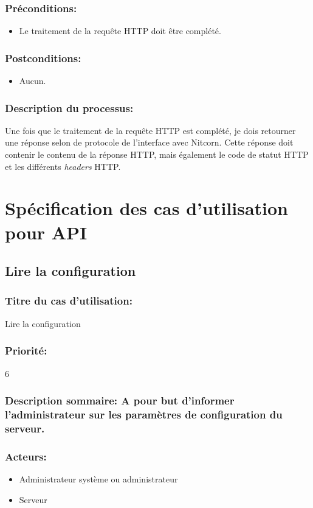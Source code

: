 \documentclass{scrreprt}
\begin{document}
\subsubsection{Préconditions:}
\begin{itemize}
	\item Le traitement de la requête HTTP doit être complété.
\end{itemize}

\subsubsection{Postconditions:}
\begin{itemize}
	\item Aucun.
\end{itemize}

\subsubsection{Description du processus:}
Une fois que le traitement de la requête HTTP est complété, je dois retourner une 
réponse selon de protocole de l'interface avec Nitcorn. Cette réponse doit
contenir le contenu de la réponse HTTP, mais également le code de statut HTTP
et les différents \textit{headers} HTTP.

\section{Spécification des cas d'utilisation pour API}
\subsection{Lire la configuration}
\subsubsection{Titre du cas d'utilisation:} Lire la configuration
\subsubsection{Priorité:} 6
\subsubsection{Description sommaire: A pour but d'informer l'administrateur sur les paramètres de configuration du serveur.}
\subsubsection{Acteurs:}
\begin{itemize}
	\item Administrateur système ou administrateur
    \item Serveur
\end{itemize}
\end{document}
